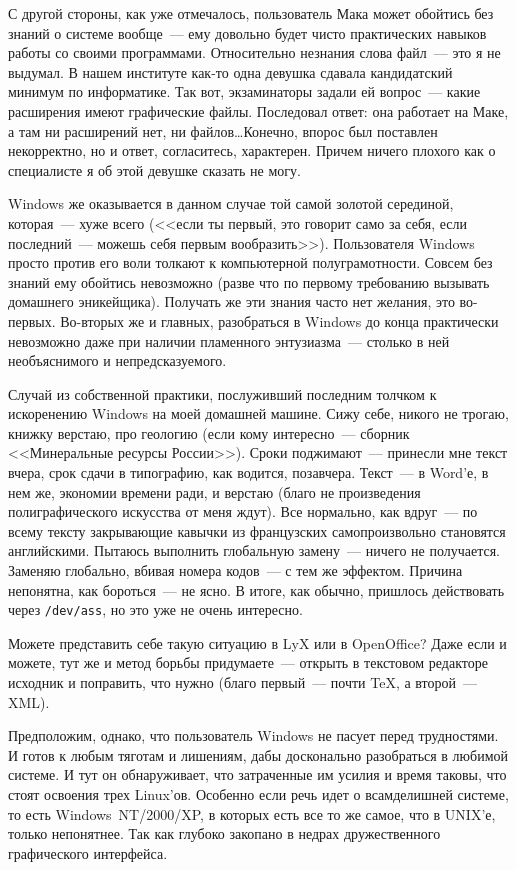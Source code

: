 С другой стороны, как уже отмечалось, пользователь Мака может обойтись без знаний о системе вообще~--- ему довольно будет чисто практических навыков работы со своими программами. Относительно незнания слова файл~--- это я не выдумал. В нашем институте как-то одна девушка сдавала кандидатский минимум по информатике. Так вот, экзаминаторы задали ей вопрос~--- какие расширения имеют графические файлы. Последовал ответ: она работает на Маке, а там ни расширений нет, ни файлов\dots Конечно, впорос был поставлен некорректно, но и ответ, согласитесь, характерен. Причем ничего плохого как о специалисте я об этой девушке сказать не могу.

Windows же оказывается в данном случае той самой золотой серединой, которая~--- хуже всего (<<если ты первый, это говорит само за себя, если последний~--- можешь себя первым вообразить>>). Пользователя Windows просто против его воли толкают к компьютерной полуграмотности. Совсем без знаний ему обойтись невозможно (разве что по первому требованию вызывать домашнего эникейщика). Получать же эти знания часто нет желания, это во-первых. Во-вторых же и главных, разобраться в Windows до конца практически невозможно даже при наличии пламенного энтузиазма~--- столько в ней необъяснимого и непредсказуемого. 

Случай из собственной практики, послуживший последним толчком к искоренению Windows на моей домашней машине. Сижу себе, никого не трогаю, книжку верстаю, про геологию (если кому интересно~--- сборник <<Минеральные ресурсы России>>). Сроки поджимают~--- принесли мне текст вчера, срок сдачи в типографию, как водится, позавчера. Текст~--- в Word'е, в нем же, экономии времени ради, и верстаю (благо не произведения полиграфического искусства от меня ждут). Все нормально, как вдруг~--- по всему тексту закрывающие кавычки из французских самопроизвольно становятся английскими. Пытаюсь выполнить глобальную замену~--- ничего не получается. Заменяю глобально, вбивая номера кодов~--- с тем же эффектом. Причина непонятна, как бороться~--- не ясно. В итоге, как обычно, пришлось действовать через \texttt{/dev/ass}, но это уже не очень интересно.

Можете представить себе такую ситуацию в LyX или в OpenOffice? Даже если и можете, тут же и метод борьбы придумаете~--- открыть в текстовом редакторе исходник и поправить, что нужно (благо первый~--- почти \TeX, а второй~--- XML). 

Предположим, однако, что пользователь Windows не пасует перед трудностями. И готов к любым тяготам и лишениям, дабы досконально разобраться в любимой системе. И тут он обнаруживает, что затраченные им усилия и время таковы, что стоят освоения трех Linux'ов. Особенно если речь идет о всамделишней системе, то есть Windows~NT/2000/XP, в которых есть все то же самое, что в UNIX'е, только непонятнее. Так как глубоко закопано в недрах дружественного графического интерфейса. 

